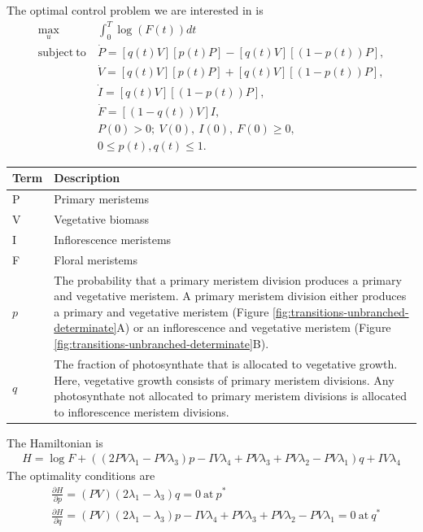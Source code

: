 \documentclass[12pt, oneside]{article}   	%
\begin{document}
The optimal control problem we are interested in is
%
\begin{align}
\max_{u} &  \int_0^T  \log( F(t) ) dt  \nonumber \\
\mathrm{subject\ to\ } 
& \dot{P} = [q(t) V] [p(t) P] - [q(t) V] [(1 - p(t)) P ] , \nonumber \\
& \dot{V} = [q(t) V] [ p(t) P]  + [q(t) V] [(1 - p(t)) P] , \nonumber \\ 
& \dot{I} = [q(t) V] [( 1-p(t) ) P], \nonumber \\ 
& \dot{F} = [(1-q(t)) V] I , \nonumber \\ 
& P(0) > 0;\ V(0),\ I(0),\ F(0) \geq 0, \nonumber \\
& 0 \leq p(t), q(t) \leq 1.  
\end{align}
%
\begin{table}[hbt!]
\footnotesize
\begin{tabularx}{\linewidth}{|l|X|}
\hline
\textbf{Term} & \textbf{Description} \\ \hline
 P    & Primary meristems            \\ \hline
 V   &  Vegetative biomass         \\ \hline
 I   &  Inflorescence meristems          \\ \hline
 F   &  Floral meristems          \\ \hline
 $p$  &  The probability that a primary meristem division produces a primary and vegetative meristem. A primary meristem division either produces a primary and vegetative meristem (Figure \ref{fig:transitions-unbranched-determinate}A) or an inflorescence and vegetative meristem (Figure \ref{fig:transitions-unbranched-determinate}B).      \\ \hline
 $q$   &  The fraction of photosynthate that is allocated to vegetative growth. Here, vegetative growth consists of primary meristem divisions. Any photosynthate not allocated to primary meristem divisions is allocated to inflorescence meristem divisions.         \\ \hline
\end{tabularx}
\end{table}
%
\noindent The Hamiltonian is 
%
\begin{align}
H = \log F +
((2PV \lambda_1-PV \lambda_3 )p-IV \lambda_4+PV \lambda_3+PV \lambda_2-PV \lambda_1)q+IV \lambda_4
\end{align}
%
The optimality conditions are
%
\begin{align}
& \frac{\partial H}{\partial p} = (PV)( 2\lambda_1 - \lambda_3)q = 0\ \mathrm{at}\ p^* \\
&\frac{\partial H}{\partial q} =  (PV) ( 2\lambda_1- \lambda_3)p-IV \lambda_4+PV \lambda_3+PV \lambda_2-PV \lambda_1 = 0\ \mathrm{at}\ q^* 
\end{align}
\end{document}
